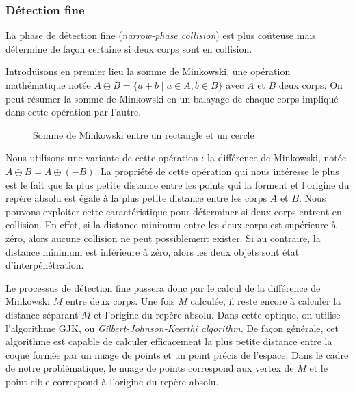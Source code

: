 \begin{figure}
  \centering
  \subfloat[]{  }
  \qquad
  \subfloat[]{  }
  \qquad
  \subfloat[]{  }
\end{figure}

\subsubsection{Détection fine}

La phase de détection fine (\textit{narrow-phase collision}) est plus
coûteuse mais détermine de façon certaine si deux corps sont en
collision.

Introduisons en premier lieu la somme de Minkowski, une opération
mathématique notée $A \oplus B = \{a + b \mid a \in A, b \in B\}$ avec
$A$ et $B$ deux corps. On peut résumer la somme de Minkowski en un
balayage de chaque corps impliqué dans cette opération par l'autre.

\begin{figure}
  
  \caption{Somme de Minkowski entre un rectangle et un cercle}
\end{figure}

Nous utilisons une variante de cette opération : la différence de
Minkowski, notée $A \ominus B = A \oplus (-B)$. La propriété de cette
opération qui nous intéresse le plus est le fait que la plus petite
distance entre les points qui la forment et l'origine du repère absolu
est égale à la plus petite distance entre les corps $A$ et $B$. Nous
pouvons exploiter cette caractéristique pour déterminer si deux corps
entrent en collision. En effet, si la distance minimum entre les deux
corps est supérieure à zéro, alors aucune collision ne peut
possiblement exister. Si au contraire, la distance minimum est
inférieure à zéro, alors les deux objets sont état d'interpénétration.

Le processus de détection fine passera donc par le calcul de la
différence de Minkowski $M$ entre deux corps. Une fois $M$ calculée,
il reste encore à calculer la distance séparant $M$ et l'origine du
repère absolu. Dans cette optique, on utilise l'algorithme GJK, ou
\textit{Gilbert-Johnson-Keerthi algorithm}. De façon générale, cet
algorithme est capable de calculer efficacement la plus petite
distance entre la coque formée par un nuage de points et un point
précis de l'espace. Dans le cadre de notre problématique, le nuage de
points correspond aux vertex de $M$ et le point cible correspond à
l'origine du repère absolu.

